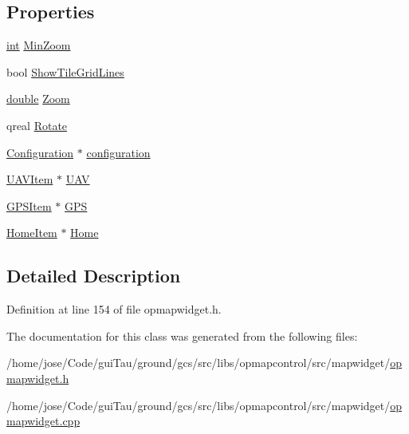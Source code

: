 \subsection*{Properties}
\begin{DoxyCompactItemize}
\item 
\hyperlink{ioapi_8h_a787fa3cf048117ba7123753c1e74fcd6}{int} \hyperlink{group___o_p_map_widget_gac91f92751a3ac3a5a10a6592d4213d42}{Min\-Zoom}
\item 
bool \hyperlink{group___o_p_map_widget_ga41a15a2c8198b2ad76d2b494917a02ed}{Show\-Tile\-Grid\-Lines}
\item 
\hyperlink{_super_l_u_support_8h_a8956b2b9f49bf918deed98379d159ca7}{double} \hyperlink{group___o_p_map_widget_gadc46820d44c2517e9a6014ddede98099}{Zoom}
\item 
qreal \hyperlink{group___o_p_map_widget_gac0960d6e34ea06d84ddad72f930a3917}{Rotate}
\item 
\hyperlink{classmapcontrol_1_1_configuration}{Configuration} $\ast$ \hyperlink{group___o_p_map_widget_gaa79e123990d6d7b2f1c45e5c2a56313d}{configuration}
\item 
\hyperlink{classmapcontrol_1_1_u_a_v_item}{U\-A\-V\-Item} $\ast$ \hyperlink{group___o_p_map_widget_gabb5c6c7e07970a7f9b774ebf94cd2286}{U\-A\-V}
\item 
\hyperlink{classmapcontrol_1_1_g_p_s_item}{G\-P\-S\-Item} $\ast$ \hyperlink{group___o_p_map_widget_ga83798c623babeffb173d483ad1c84ccc}{G\-P\-S}
\item 
\hyperlink{classmapcontrol_1_1_home_item}{Home\-Item} $\ast$ \hyperlink{group___o_p_map_widget_ga3c39e182c87b25990664fbe7dd0a9eff}{Home}
\end{DoxyCompactItemize}


\subsection{Detailed Description}


Definition at line 154 of file opmapwidget.\-h.



The documentation for this class was generated from the following files\-:\begin{DoxyCompactItemize}
\item 
/home/jose/\-Code/gui\-Tau/ground/gcs/src/libs/opmapcontrol/src/mapwidget/\hyperlink{opmapwidget_8h}{opmapwidget.\-h}\item 
/home/jose/\-Code/gui\-Tau/ground/gcs/src/libs/opmapcontrol/src/mapwidget/\hyperlink{opmapwidget_8cpp}{opmapwidget.\-cpp}\end{DoxyCompactItemize}
